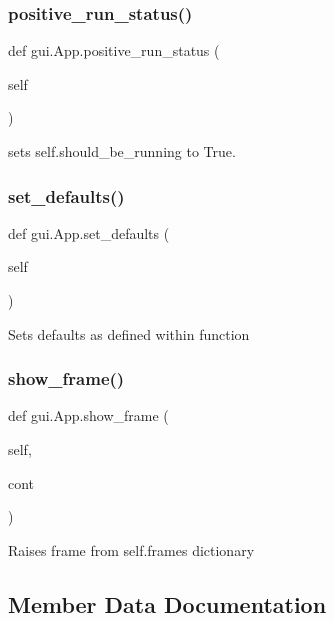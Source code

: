 \subsubsection{\texorpdfstring{positive\_run\_status()}{positive\_run\_status()}}
{\footnotesize\ttfamily def gui.\+App.\+positive\+\_\+run\+\_\+status (\begin{DoxyParamCaption}\item[{}]{self }\end{DoxyParamCaption})}

\begin{DoxyVerb}sets self.should_be_running to True.
\end{DoxyVerb}
 \mbox{\label{classgui_1_1_app_a56ecfd60fdee6dd2e37712d15ceff922}} 
\subsubsection{\texorpdfstring{set\_defaults()}{set\_defaults()}}
{\footnotesize\ttfamily def gui.\+App.\+set\+\_\+defaults (\begin{DoxyParamCaption}\item[{}]{self }\end{DoxyParamCaption})}

\begin{DoxyVerb}Sets defaults as defined within function
\end{DoxyVerb}
 \mbox{\label{classgui_1_1_app_a876e7380c626ec624ff1c08a55253f1e}} 
\subsubsection{\texorpdfstring{show\_frame()}{show\_frame()}}
{\footnotesize\ttfamily def gui.\+App.\+show\+\_\+frame (\begin{DoxyParamCaption}\item[{}]{self,  }\item[{}]{cont }\end{DoxyParamCaption})}

\begin{DoxyVerb}Raises frame from self.frames dictionary
\end{DoxyVerb}
 

\subsection{Member Data Documentation}
\mbox{\label{classgui_1_1_app_aaa721570191997007c3664129d3cdeb1}} 
